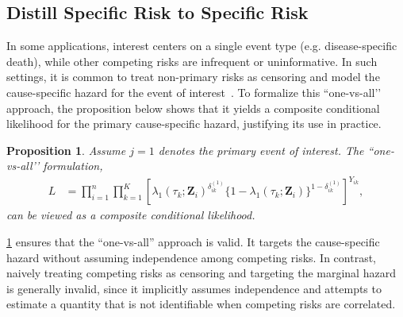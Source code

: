 \documentclass{article}
\theoremstyle{plain}
\newtheorem{proposition}[theorem]{Proposition}
\theoremstyle{definition}
\theoremstyle{remark}
\begin{document}




\subsection{Distill Specific Risk to Specific Risk}
\label{sec.specific}
In some applications, interest centers on a single event type (e.g. disease-specific death),  while other competing risks are infrequent or  uninformative. In such settings, it is common to treat non-primary risks as censoring and model the cause-specific hazard for the event of interest~\citep{lee2018analysis,wu2022analysis}. %
To formalize this “one-vs-all’’ approach, the proposition below shows that it yields a composite conditional likelihood for the primary cause-specific hazard, justifying its use in practice. 
\begin{proposition}
  \label{prop4}
  Assume $j=1$ denotes the primary event of interest. The 
“one-vs-all’’ formulation,
\begin{align}
   L
   & = 
   \prod_{i =1}^n \prod_{k=1}^{K} \left[\lambda_1(\tau_k;\bm Z_i)^{\delta_{ik}^{(1)}} \{1-\lambda_1(\tau_k;\bm Z_i)\}^{1-\delta_{ik}^{(1)}}\right]^{Y_{ik}}, \nonumber
\end{align}
can be viewed as a composite conditional likelihood.
\end{proposition}
\cref{prop4} ensures that the “one-vs-all” approach is valid. It targets the cause-specific hazard without assuming independence among competing risks. In contrast,  naively treating competing risks as censoring and targeting the marginal hazard is generally invalid, since it implicitly assumes independence and attempts to estimate a quantity that is not identifiable when competing risks are correlated. 
\end{document}
